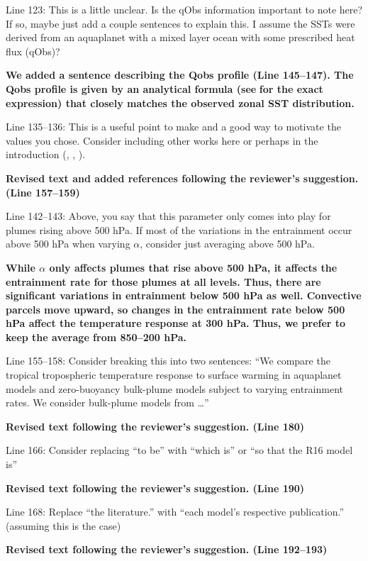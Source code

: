 \documentclass[11pt]{article}
\begin{document}
Line 123: This is a little unclear. Is the qObs information important to note here? If so, maybe just add a couple sentences to explain this. I assume the SSTs were derived from an aquaplanet with a mixed layer ocean with some prescribed heat flux (qObs)?

\textbf{We added a sentence describing the Qobs profile (Line 145--147). The Qobs profile is given by an analytical formula (see} \cite{neale_standard_2000} \textbf{for the exact expression) that closely matches the observed zonal SST distribution.}

Line 135--136: This is a useful point to make and a good way to motivate the values you chose. Consider including other works here or perhaps in the introduction (\cite{jang_simulation_2013}, \cite{ham_what_2013}, \cite{kim_ninosouthern_2011}).

\textbf{Revised text and added references following the reviewer's suggestion. (Line 157--159)}

Line 142--143: Above, you say that this parameter only comes into play for plumes rising above 500 hPa. If most of the variations in the entrainment occur above 500 hPa when varying \(\alpha\), consider just averaging above 500 hPa.

\textbf{While $\alpha$ only affects plumes that rise above 500 hPa, it affects the entrainment rate for those plumes at all levels. Thus, there are significant variations in entrainment below 500 hPa as well. Convective parcels move upward, so changes in the entrainment rate below 500 hPa affect the temperature response at 300 hPa. Thus, we prefer to keep the average from 850--200 hPa.}

Line 155--158: Consider breaking this into two sentences: ``We compare the tropical tropospheric temperature response to surface warming in aquaplanet models and zero-buoyancy bulk-plume models subject to varying entrainment rates. We consider bulk-plume models from \ldots{}''

\textbf{Revised text following the reviewer's suggestion. (Line 180)}

Line 166: Consider replacing ``to be'' with ``which is'' or ``so that the R16 model is''

\textbf{Revised text following the reviewer's suggestion. (Line 190)}

Line 168: Replace ``the literature.'' with ``each model's respective publication.'' (assuming this is the case)

\textbf{Revised text following the reviewer's suggestion. (Line 192--193)}
\end{document}
